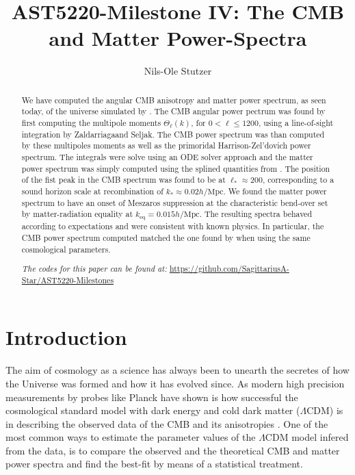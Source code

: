 \documentclass[twocolumn]{aastex62}
\begin{document}
\title{\Large AST5220-Milestone IV: The CMB and Matter Power-Spectra}

\author{Nils-Ole Stutzer}

\begin{abstract}
    We have computed the angular CMB anisotropy and matter power spectrum, as seen today, of the universe simulated by \cite{stutzer:2020a,stutzer:2020b,stutzer:2020c}. The CMB angular power pectrum was found by first computing the multipole moments $\Theta_\ell(k)$, for $0 < \ell \leq 1200$, using a line-of-sight integration by Zaldarriagaand Seljak. The CMB power spectrum was than computed by these multipoles moments as well as the primoridal Harrison-Zel'dovich power spectrum. The integrals were solve using an ODE solver approach and the matter power spectrum was simply computed using the splined quantities from \cite{stutzer:2020c}. The position of the fist peak in the CMB spectrum was found to be at $\ell_* \approx 200$, corresponding to a sound horizon scale at recombination of $k_*\approx 0.02 h/\mathrm{Mpc}$. We found the matter power spectrum to have an onset of Meszaros suppression at the characteristic bend-over set by matter-radiation equality at $k_\text{eq} = 0.015 h/\mathrm{Mpc}$. The resulting spectra behaved according to expectations and were consistent with known physics. In particular, the CMB power spectrum computed matched the one found by \cite{callin:2006} when using the same cosmological parameters.


    \textit{The codes for this paper can be found at:} \newline \url{https://github.com/SagittariusA-Star/AST5220-Milestones}
\end{abstract}

\section{Introduction} \label{sec:Intro}
The aim of cosmology as a science has always been to unearth the secretes of how the Universe was formed and how it has evolved since. As modern high precision
measurements by probes like Planck have shown is how successful the cosmological standard model with dark energy and cold dark matter ($\Lambda$CDM) is in describing the observed data of the CMB and its anisotropies \citep[]{planckcollaboration:2018}. One of the most common ways to estimate the parameter values of the $\Lambda$CDM model infered from the data, is to compare the observed and the theoretical CMB and matter power spectra and find the best-fit by means of a statistical treatment. 
\end{document}
